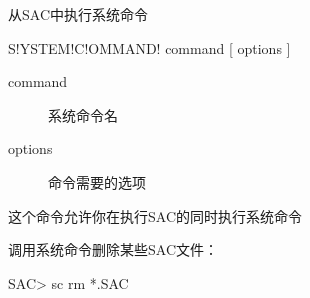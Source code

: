 \label{cmd:systemcommand}

从SAC中执行系统命令

\begin{SACSTX}
S!YSTEM!C!OMMAND! command [ options ]
\end{SACSTX}

\begin{description}
\item [command] 系统命令名 
\item [options] 命令需要的选项
\end{description}

这个命令允许你在执行SAC的同时执行系统命令

调用系统命令删除某些SAC文件：
\begin{SACCode}
SAC> sc rm *.SAC
\end{SACCode}
